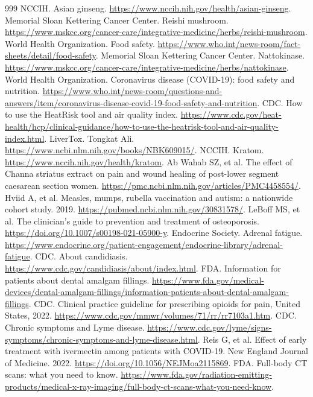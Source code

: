 \documentclass[11pt,oneside]{book}
\begin{document}
\begin{thebibliography}{999}
NCCIH. Asian ginseng. \url{https://www.nccih.nih.gov/health/asian-ginseng}.
Memorial Sloan Kettering Cancer Center. Reishi mushroom. \url{https://www.mskcc.org/cancer-care/integrative-medicine/herbs/reishi-mushroom}.
World Health Organization. Food safety. \url{https://www.who.int/news-room/fact-sheets/detail/food-safety}.
Memorial Sloan Kettering Cancer Center. Nattokinase. \url{https://www.mskcc.org/cancer-care/integrative-medicine/herbs/nattokinase}.
World Health Organization. Coronavirus disease (COVID-19): food safety and nutrition. \url{https://www.who.int/news-room/questions-and-answers/item/coronavirus-disease-covid-19-food-safety-and-nutrition}.
CDC. How to use the HeatRisk tool and air quality index. \url{https://www.cdc.gov/heat-health/hcp/clinical-guidance/how-to-use-the-heatrisk-tool-and-air-quality-index.html}.
LiverTox. Tongkat Ali. \url{https://www.ncbi.nlm.nih.gov/books/NBK609015/}.
NCCIH. Kratom. \url{https://www.nccih.nih.gov/health/kratom}.
Ab Wahab SZ, et al. The effect of Channa striatus extract on pain and wound healing of post-lower segment caesarean section women. \url{https://pmc.ncbi.nlm.nih.gov/articles/PMC4458554/}.
Hviid A, et al. Measles, mumps, rubella vaccination and autism: a nationwide cohort study. 2019. \url{https://pubmed.ncbi.nlm.nih.gov/30831578/}.
LeBoff MS, et al. The clinician's guide to prevention and treatment of osteoporosis. \url{https://doi.org/10.1007/s00198-021-05900-y}.
Endocrine Society. Adrenal fatigue. \url{https://www.endocrine.org/patient-engagement/endocrine-library/adrenal-fatigue}.
CDC. About candidiasis. \url{https://www.cdc.gov/candidiasis/about/index.html}.
FDA. Information for patients about dental amalgam fillings. \url{https://www.fda.gov/medical-devices/dental-amalgam-fillings/information-patients-about-dental-amalgam-fillings}.
CDC. Clinical practice guideline for prescribing opioids for pain, United States, 2022. \url{https://www.cdc.gov/mmwr/volumes/71/rr/rr7103a1.htm}.
CDC. Chronic symptoms and Lyme disease. \url{https://www.cdc.gov/lyme/signs-symptoms/chronic-symptoms-and-lyme-disease.html}.
Reis G, et al. Effect of early treatment with ivermectin among patients with COVID-19. New England Journal of Medicine. 2022. \url{https://doi.org/10.1056/NEJMoa2115869}.
FDA. Full-body CT scans: what you need to know. \url{https://www.fda.gov/radiation-emitting-products/medical-x-ray-imaging/full-body-ct-scans-what-you-need-know}.

\end{thebibliography}
\end{document}
